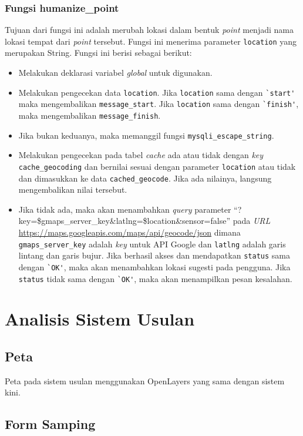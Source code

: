 \subsubsection{Fungsi humanize\_point}
Tujuan dari fungsi ini adalah merubah lokasi dalam bentuk \textit{point} menjadi nama lokasi tempat dari \textit{point} tersebut. Fungsi ini menerima parameter \verb!location! yang merupakan String. Fungsi ini berisi sebagai berikut:
\begin{itemize}
	\item Melakukan deklarasi variabel \textit{global} untuk digunakan.
	\item Melakukan pengecekan data \verb!location!. Jika \verb!location! sama dengan \verb!`start'! maka mengembalikan \verb!message_start!. Jika \verb!location! sama dengan \verb!`finish'!, maka mengembalikan \verb!message_finish!.
	\item Jika bukan keduanya, maka memanggil fungsi \verb!mysqli_escape_string!.
	\item Melakukan pengecekan pada tabel \textit{cache} ada atau tidak dengan \textit{key} \verb!cache_geocoding! dan bernilai sesuai dengan parameter \verb!location! atau tidak dan dimasukkan ke data \verb!cached_geocode!. Jika ada nilainya, langsung mengembalikan nilai tersebut.
	\item Jika tidak ada, maka akan menambahkan \textit{query} parameter ``?key=\$gmaps\_server\_key\&latlng=\$location\&sensor=false'' pada \textit{URL} \url{https://maps.googleapis.com/maps/api/geocode/json} dimana \verb!gmaps_server_key! adalah \textit{key} untuk API Google dan \verb!latlng! adalah garis lintang dan garis bujur. Jika berhasil akses dan mendapatkan \verb!status! sama dengan \verb!`OK'!, maka akan menambahkan lokasi sugesti pada pengguna. Jika \verb!status! tidak sama dengan \verb!`OK'!, maka akan menampilkan pesan kesalahan. 
\end{itemize}
\section{Analisis Sistem Usulan}
\label{sec:perubahan}

\subsection{Peta}
Peta pada sistem usulan menggunakan OpenLayers yang sama dengan sistem kini.

\subsection{Form Samping}
